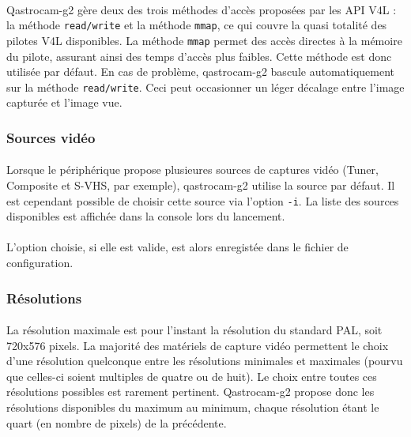 \documentclass[11pt,a4paper]{book}
\begin{document}
\paragraph*{}
Qastrocam-g2 g\`ere deux des trois m\'ethodes d'acc\`es propos\'ees par les API V4L : la m\'ethode
{\tt read/write} et la m\'ethode {\tt mmap}, ce qui couvre la quasi totalit\'e des pilotes V4L
disponibles. La m\'ethode {\tt mmap} permet des acc\`es directes \`a la m\'emoire du pilote,
assurant ainsi des temps d'acc\`es plus faibles. Cette m\'ethode est donc utilis\'ee par d\'efaut.
En cas de probl\`eme, qastrocam-g2 bascule automatiquement sur la m\'ethode {\tt read/write}. Ceci
peut occasionner un l\'eger d\'ecalage entre l'image captur\'ee et l'image vue. 

\subsubsection{Sources vid\'eo}

\paragraph*{}
Lorsque le p\'eriph\'erique propose plusieures sources de captures vid\'eo (Tuner, Composite et
S-VHS, par exemple), qastrocam-g2 utilise la source par d\'efaut. Il est cependant possible de
choisir cette source via l'option {\tt -i}. La liste des sources disponibles est affich\'ee dans
la console lors du lancement.

\paragraph*{}
L'option choisie, si elle est valide, est alors enregist\'ee dans le fichier de configuration.

\subsubsection{R\'esolutions}

\paragraph*{}
La r\'esolution maximale est pour l'instant la r\'esolution du standard PAL, soit 720x576 pixels.
La majorit\'e des mat\'eriels de capture vid\'eo permettent le choix d'une r\'esolution quelconque
entre les r\'esolutions minimales et maximales (pourvu que celles-ci soient multiples de quatre ou
de huit). Le choix entre toutes ces r\'esolutions possibles est rarement pertinent. Qastrocam-g2
propose donc les r\'esolutions disponibles du maximum au minimum, chaque r\'esolution \'etant
le quart (en nombre de pixels) de la pr\'ec\'edente.
\end{document}
